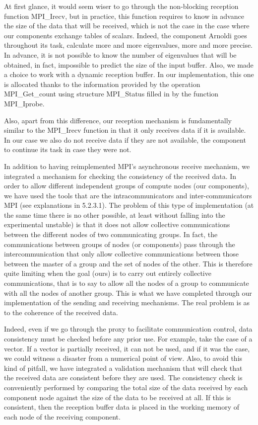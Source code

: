At first glance, it would seem wiser to go through the non-blocking reception function MPI\_Irecv, but in practice, this function requires to know in advance the size of the data that will be received, which is not the case in the case where our components exchange tables of scalars. Indeed, the component Arnoldi goes throughout its task, calculate more and more eigenvalues, more and more precise. In advance, it is not possible to know the number of eigenvalues that will be obtained, in fact, impossible to predict the size of the input buffer. Also, we made a choice to work with a dynamic reception buffer. In our implementation, this one is allocated thanks to the information provided by the operation MPI\_Get\_count using structure MPI\_Status filled in by the function MPI\_Iprobe.

Also, apart from this difference, our reception mechanism is fundamentally similar to the MPI\_Irecv function in that it only receives data if it is available. In our case we also do not receive data if they are not available, the component to continue its task in case they were not. 

In addition to having reimplemented MPI's asynchronous receive mechanism, we integrated a mechanism for checking the consistency of the received data. In order to allow different independent groups of compute nodes (our components), we have used the tools that are the intracommunicators and inter-communicators MPI (see explanations in 5.2.3.1). The problem of this type of implementation (at the same time there is no other possible, at least without falling into the experimental unstable) is that it does not allow collective communications between the different nodes of two communicating groups. In fact, the communications between groups of nodes (or components) pass through the intercommunication that only allow collective communications between those between the master of a group and the set of nodes of the other. This is therefore quite limiting when the goal (ours) is to carry out entirely collective communications, that is to say to allow all the nodes of a group to communicate with all the nodes of another group. This is what we have completed through our implementation of the sending and receiving mechanisms. The real problem is as to the coherence of the received data.

Indeed, even if we go through the proxy to facilitate communication control, data consistency must be checked before any prior use. For example, take the case of a vector. If a vector is partially received, it can not be used, and if it was the case, we could witness a disaster from a numerical point of view. Also, to avoid this kind of pitfall, we have integrated a validation mechanism that will check that the received data are consistent before they are used. The consistency check is conveniently performed by comparing the total size of the data received by each component node against the size of the data to be received at all. If this is consistent, then the reception buffer data is placed in the working memory of each node of the receiving component.


